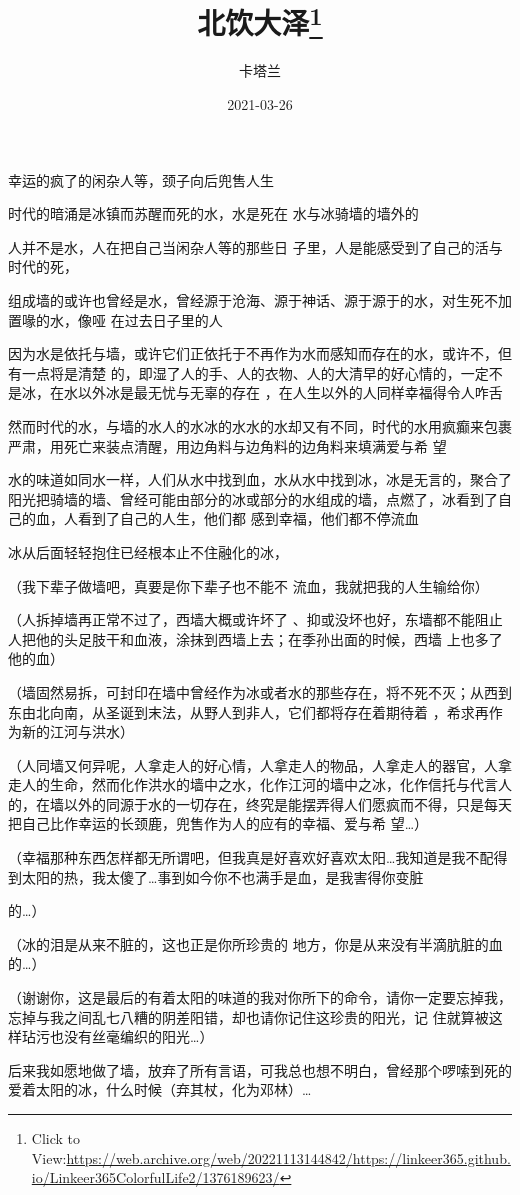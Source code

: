 \documentclass{article}
\title{北饮大泽\footnote{Click to View:\url{https://web.archive.org/web/20221113144842/https://linkeer365.github.io/Linkeer365ColorfulLife2/1376189623/}}}
\author{卡塔兰}
\date{2021-03-26}
\begin{document}

\maketitle


\Large

﻿幸运的疯了的闲杂人等，颈子向后兜售人生
 

时代的暗涌是冰镇而苏醒而死的水，水是死在
水与冰骑墙的墙外的 

人并不是水，人在把自己当闲杂人等的那些日
子里，人是能感受到了自己的活与时代的死， 

组成墙的或许也曾经是水，曾经源于沧海、源于神话、源于源于的水，对生死不加置喙的水，像哑
在过去日子里的人 

因为水是依托与墙，或许它们正依托于不再作为水而感知而存在的水，或许不，但有一点将是清楚
\newpage
的，即湿了人的手、人的衣物、人的大清早的好心情的，一定不是冰，在水以外冰是最无忧与无辜的存在
，在人生以外的人同样幸福得令人咋舌 

然而时代的水，与墙的水人的水冰的水水的水却又有不同，时代的水用疯癫来包裹严肃，用死亡来装点清醒，用边角料与边角料的边角料来填满爱与希
望 

水的味道如同水一样，人们从水中找到血，水从水中找到冰，冰是无言的，聚合了阳光把骑墙的墙、曾经可能由部分的冰或部分的水组成的墙，点燃了，冰看到了自己的血，人看到了自己的人生，他们都
感到幸福，他们都不停流血 

冰从后面轻轻抱住已经根本止不住融化的冰，

（我下辈子做墙吧，真要是你下辈子也不能不
流血，我就把我的人生输给你） 

（人拆掉墙再正常不过了，西墙大概或许坏了
\newpage
、抑或没坏也好，东墙都不能阻止人把他的头足肢干和血液，涂抹到西墙上去；在季孙出面的时候，西墙
上也多了他的血） 

（墙固然易拆，可封印在墙中曾经作为冰或者水的那些存在，将不死不灭；从西到东由北向南，从圣诞到末法，从野人到非人，它们都将存在着期待着
，希求再作为新的江河与洪水） 

（人同墙又何异呢，人拿走人的好心情，人拿走人的物品，人拿走人的器官，人拿走人的生命，然而化作洪水的墙中之水，化作江河的墙中之冰，化作信托与代言人的，在墙以外的同源于水的一切存在，终究是能摆弄得人们愿疯而不得，只是每天把自己比作幸运的长颈鹿，兜售作为人的应有的幸福、爱与希
望…） 

（幸福那种东西怎样都无所谓吧，但我真是好喜欢好喜欢太阳…我知道是我不配得到太阳的热，我太傻了…事到如今你不也满手是血，是我害得你变脏

\newpage
的…） 

（冰的泪是从来不脏的，这也正是你所珍贵的
地方，你是从来没有半滴肮脏的血的…） 

（谢谢你，这是最后的有着太阳的味道的我对你所下的命令，请你一定要忘掉我，忘掉与我之间乱七八糟的阴差阳错，却也请你记住这珍贵的阳光，记
住就算被这样玷污也没有丝毫编织的阳光…） 

后来我如愿地做了墙，放弃了所有言语，可我总也想不明白，曾经那个啰嗦到死的爱着太阳的冰，什么时候（弃其杖，化为邓林）…
\end{document}
